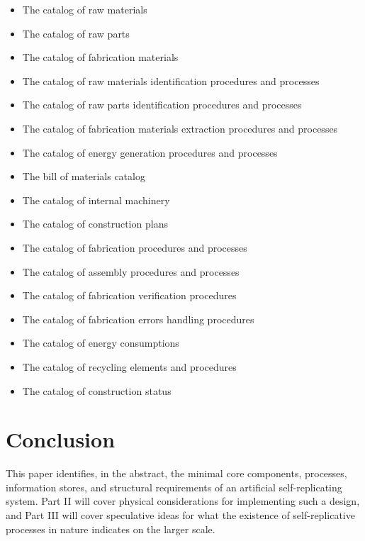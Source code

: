 \begin{itemize}
\item The catalog of raw materials
\item The catalog of raw parts
\item The catalog of fabrication materials
\item The catalog of raw materials identification procedures and
processes
\item The catalog of raw parts identification procedures and processes
\item The catalog of fabrication materials extraction procedures and
processes
\item The catalog of energy generation procedures and processes
\item The bill of materials catalog
\item The catalog of internal machinery
\item The catalog of construction plans
\item The catalog of fabrication procedures and processes
\item The catalog of assembly procedures and processes
\item The catalog of fabrication verification procedures
\item The catalog of fabrication errors handling procedures
\item The catalog of energy consumptions
\item The catalog of recycling elements and procedures
\item The catalog of construction status
\end{itemize}

\section{Conclusion}

This paper identifies, in the abstract, the minimal core components,
processes, information stores, and structural requirements of an artificial 
self-replicating system.  Part II will cover physical considerations for
implementing such a design, and Part III will cover speculative ideas for
what the existence of self-replicative processes in nature indicates on the
larger scale.
